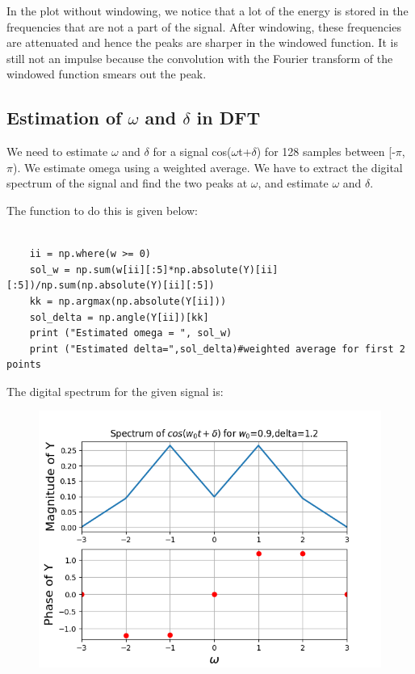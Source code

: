 \documentclass[11pt, a4paper]{article}
\begin{document}
In the plot without windowing, we notice that a lot of the energy is stored in the frequencies that are not a part of the signal. After windowing, these frequencies are attenuated and hence the peaks are sharper in the windowed function. It is still not an impulse because the convolution with the Fourier transform of the windowed function smears out the peak.

\subsection*{Estimation of $\omega$ and $\delta$ in DFT}
We need to estimate $\omega$ and $\delta$ for a signal cos($\omega$t+$\delta$) for 128 samples between [-$\pi$, $\pi$). We estimate omega using a weighted average. We have to extract the digital spectrum of the signal and find the two peaks at $\omega$, and estimate $\omega$ and $\delta$.

The function to do this is given below:
\begin{verbatim}

	ii = np.where(w >= 0)
	sol_w = np.sum(w[ii][:5]*np.absolute(Y)[ii][:5])/np.sum(np.absolute(Y)[ii][:5])
	kk = np.argmax(np.absolute(Y[ii]))
	sol_delta = np.angle(Y[ii])[kk]
	print ("Estimated omega = ", sol_w)
	print ("Estimated delta=",sol_delta)#weighted average for first 2 points

\end{verbatim}

The digital spectrum for the given signal is:

\begin{figure}[!tbh]
\centering
\includegraphics[scale=0.7]{assgn10_plot10.png} 
\label{fig10}
\end{figure} 
\end{document}
